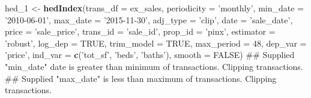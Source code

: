 \documentclass[]{article}
\newenvironment{Shaded}{\begin{snugshade}}{\end{snugshade}}
\newcommand{\DataTypeTok}[1]{\textcolor[rgb]{0.13,0.29,0.53}{#1}}
\newcommand{\DecValTok}[1]{\textcolor[rgb]{0.00,0.00,0.81}{#1}}
\newcommand{\KeywordTok}[1]{\textcolor[rgb]{0.13,0.29,0.53}{\textbf{#1}}}
\newcommand{\NormalTok}[1]{#1}
\newcommand{\OtherTok}[1]{\textcolor[rgb]{0.56,0.35,0.01}{#1}}
\newcommand{\StringTok}[1]{\textcolor[rgb]{0.31,0.60,0.02}{#1}}
\begin{document}
\begin{Shaded}
\begin{Highlighting}[]
\NormalTok{  hed_}\DecValTok{1}\NormalTok{ <-}\StringTok{ }\KeywordTok{hedIndex}\NormalTok{(}\DataTypeTok{trans_df =}\NormalTok{ ex_sales,}
                    \DataTypeTok{periodicity =} \StringTok{'monthly'}\NormalTok{,}
                    \DataTypeTok{min_date =} \StringTok{'2010-06-01'}\NormalTok{,}
                    \DataTypeTok{max_date =} \StringTok{'2015-11-30'}\NormalTok{,}
                    \DataTypeTok{adj_type =} \StringTok{'clip'}\NormalTok{,}
                    \DataTypeTok{date =} \StringTok{'sale_date'}\NormalTok{,}
                    \DataTypeTok{price =} \StringTok{'sale_price'}\NormalTok{,}
                    \DataTypeTok{trans_id =} \StringTok{'sale_id'}\NormalTok{,}
                    \DataTypeTok{prop_id =} \StringTok{'pinx'}\NormalTok{,}
                    \DataTypeTok{estimator =} \StringTok{'robust'}\NormalTok{,}
                    \DataTypeTok{log_dep =} \OtherTok{TRUE}\NormalTok{,}
                    \DataTypeTok{trim_model =} \OtherTok{TRUE}\NormalTok{,}
                    \DataTypeTok{max_period =} \DecValTok{48}\NormalTok{,}
                    \DataTypeTok{dep_var =} \StringTok{'price'}\NormalTok{,}
                    \DataTypeTok{ind_var =} \KeywordTok{c}\NormalTok{(}\StringTok{'tot_sf'}\NormalTok{, }\StringTok{'beds'}\NormalTok{, }\StringTok{'baths'}\NormalTok{),}
                    \DataTypeTok{smooth =} \OtherTok{FALSE}\NormalTok{)}
\NormalTok{## Supplied "min_date" date is greater than minimum of transactions. Clipping transactions.}
\NormalTok{## Supplied "max_date" is less than maximum of transactions. Clipping transactions.}
\end{Highlighting}
\end{Shaded}
\end{document}

